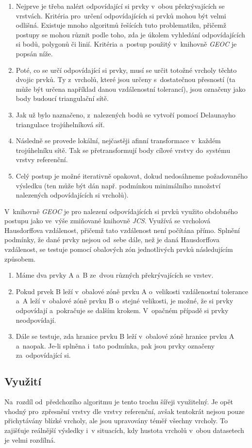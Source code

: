 \begin{enumerate}[leftmargin=*]
 \item Nejprve je třeba nalézt odpovídající si prvky v~obou překrývajících se vrstvách. Kritéria pro~určení odpovídajících si prvků mohou být velmi odlišná. Existuje mnoho
	algoritmů řešících tuto problematiku, přičemž postupy se mohou různit podle toho, zda je úkolem vyhledání odpovídajících si bodů, polygonů či linií. Kritéria a~postup
	použitý v~knihovně \textit{GEOC} je popsán níže.
 \item Poté, co se určí odpovídající si prvky, musí se určit totožné vrcholy těchto dvojic prvků. Ty z~vrcholů, které jsou určeny s~dostatečnou přesností (ta může být určena
	například danou vzdálenostní tolerancí), jsou označeny jako body budoucí triangulační sítě.
 \item Jak už bylo naznačeno, z~nalezených bodů se vytvoří pomocí Delaunayho triangulace trojúhelníková síť. %
 \item Následně se provede lokální, nejčastěji afinní transformace v~každém trojúhelníku sítě. Tak se přetransformují body cílové vrstvy do~systému vrstvy referenční.
 \item Celý postup je možné iterativně opakovat, dokud nedosáhneme požadovaného výsledku (ten může být dán např. podmínkou minimálního množství nalezených 
	odpovídajících si vrcholů).
\end{enumerate}

V~knihovně \textit{GEOC} je pro nalezení odpovídajících si prvků využito obdobného postupu jako ve~výše zmiňované knihovně \textit{JCS}. Využívá se vrcholová Hausdorffova 
vzdálenost, přičemž tato vzdálenost není počítána přímo. Splnění podmínky, že dané prvky nejsou od~sebe dále, než je daná Hausdorffova vzdálenost, se testuje pomocí obalových
zón jednotlivých prvků následujícím způsobem.

\begin{enumerate}[leftmargin=*]
 \item Máme dva prvky A a~B ze~dvou různých překrývajících se vrstev.
 \item Pokud prvek B leží v~obalové zóně prvku A o~velikosti vzdálenostní tolerance a~A leží v~obalové zóně prvku B o~stejné velikosti, je možné, že si prvky odpovídají 
	a~pokračuje se dalším krokem. V~opačném případě si prvky neodpovídají.
 \item Dále se testuje, zda hranice prvku B leží v~obalové zóně hranice prvku A a~naopak. Je-li splněna i~tato podmínka, pak jsou prvky označeny za~odpovídající si.
\end{enumerate}


\subsection{Využití}
\label{ca-vyuziti}

Na~rozdíl od~předchozího algoritmu je tento trochu šířeji využitelný. Je opět vhodný pro~zpřesnění vrstvy dle vrstvy referenční, avšak tentokrát nejsou pouze přichytávány
blízké vrcholy, ale jsou upravovány téměř všechny vrcholy. To zajišťuje reálnější výsledky i~v situacích, kdy hustota vrcholů v~obou datasetech je velmi rozdílná.
